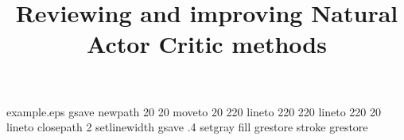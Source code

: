 %
%
%
%
%
\begin{filecontents*}{example.eps}
gsave
newpath
  20 20 moveto
  20 220 lineto
  220 220 lineto
  220 20 lineto
closepath
2 setlinewidth
gsave
  .4 setgray fill
grestore
stroke
grestore
\end{filecontents*}
%
\RequirePackage{fix-cm}
%
\documentclass[smallextended]{svjour3}       %
%
\smartqed  %
%
\usepackage{graphicx}

%
%

\usepackage{natbib} %
\usepackage{amsmath, amssymb}
\usepackage{algorithm}
\usepackage{algorithmic}


\newcommand{\x}{\item}
\DeclareMathOperator{\E}{\mathbb{E}}

%
%

\title{Reviewing and improving Natural Actor Critic methods
}

